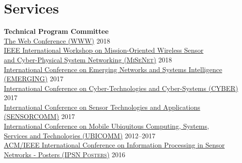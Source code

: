 
\section{\sc Services}
{\bf Technical Program Committee}\\
{\href{https://www2018.thewebconf.org/}{The Web Conference (\textsc{WWW})}} \hfill 2018\\
{\href{http://infocom2018.ieee-infocom.org/content/workshop-misenet-mission-oriented-wireless-sensor-networking}{IEEE International Workshop on Mission-Oriented Wireless Sensor \\and Cyber-Physical System Networking (\textsc{MiSeNet})}} \hfill 2018\\
{\href{http://www.iaria.org/conferences2017/EMERGING17.html}{International Conference on Emerging Networks and Systems Intelligence (\textsc{EMERGING})}} \hfill 2017\\
{\href{http://www.iaria.org/conferences2017/CYBER17.html}{International Conference on Cyber-Technologies and Cyber-Systems (\textsc{CYBER})}} \hfill 2017\\
{\href{http://www.iaria.org/conferences2017/SENSORCOMM17.html}{International Conference on Sensor Technologies and Applications (\textsc{SENSORCOMM})}} \hfill 2017\\
{\href{http://www.iaria.org/conferences2017/UBICOMM17.html}{International Conference on Mobile Ubiquitous Computing, Systems,\\ Services and Technologies (\textsc{UBICOMM})}} \hfill 2012--2017\\
{\href{http://ipsn.acm.org/2016/posters.html}{ACM/IEEE International Conference on Information Processing in Sensor\\Networks - Posters (\textsc{IPSN Posters})}} \hfill 2016\\
\vspace{-0.6cm}

